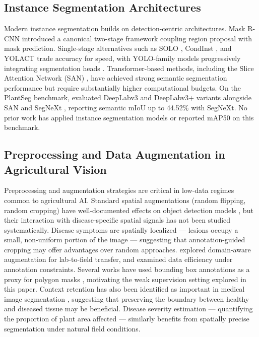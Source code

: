 \documentclass[preprint,12pt]{elsarticle}
\begin{document}
\subsection{Instance Segmentation Architectures}
Modern instance segmentation builds on detection-centric architectures. Mask R-CNN \citep{he2017mask} introduced a canonical two-stage framework coupling region proposal with mask prediction. Single-stage alternatives such as SOLO \citep{wang2020solo}, CondInst \citep{tian2020conditional}, and YOLACT \citep{bolya2019yolact} trade accuracy for speed, with YOLO-family models progressively integrating segmentation heads \citep{redmon2016you, jocher2023ultralytics, yolov11_2024}. Transformer-based methods, including the Slice Attention Network (SAN) \citep{xu2023side}, have achieved strong semantic segmentation performance but require substantially higher computational budgets. On the PlantSeg benchmark, \citet{plantseg2024} evaluated DeepLabv3 and DeepLabv3+ variants alongside SAN and SegNeXt \citep{guo2022segnext}, reporting semantic mIoU up to 44.52\% with SegNeXt. No prior work has applied instance segmentation models or reported mAP50 on this benchmark.

\subsection{Preprocessing and Data Augmentation in Agricultural Vision}
Preprocessing and augmentation strategies are critical in low-data regimes common to agricultural AI. Standard spatial augmentations (random flipping, random cropping) have well-documented effects on object detection models \citep{zoph2020learning, cubuk2020randaugment}, but their interaction with disease-specific spatial signals has not been studied systematically. Disease symptoms are spatially localized --- lesions occupy a small, non-uniform portion of the image --- suggesting that annotation-guided cropping may offer advantages over random approaches. \citet{wu2023fromlaboratoryto} explored domain-aware augmentation for lab-to-field transfer, and \citet{xu2023embracinglimitedand} examined data efficiency under annotation constraints. Several works have used bounding box annotations as a proxy for polygon masks \citep{fan2020inf, khoreva2017simple}, motivating the weak supervision setting explored in this paper. Context retention has also been identified as important in medical image segmentation \citep{chen2021transunet}, suggesting that preserving the boundary between healthy and diseased tissue may be beneficial. Disease severity estimation --- quantifying the proportion of plant area affected --- similarly benefits from spatially precise segmentation under natural field conditions.
\end{document}
